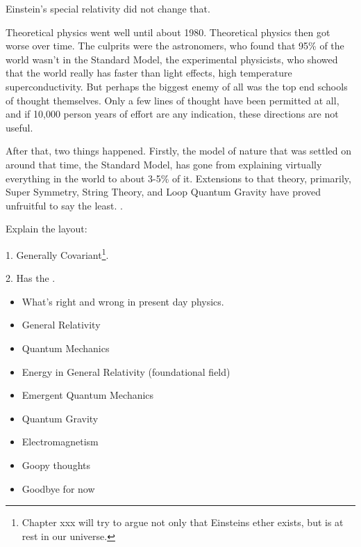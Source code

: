 \documentclass[../rzero]{subfiles}
\begin{document}
Einstein's special relativity did not change that. 

Theoretical physics went well until about 1980. Theoretical physics then got worse over time. The culprits were the astronomers, who found that 95\% of the world wasn't in the Standard Model, the experimental physicists, who showed that the world really has faster than light effects, high temperature superconductivity. But perhaps the biggest enemy of all was the top end schools of thought themselves. Only a few lines of thought have been permitted at all, and if 10,000 person years of effort are any indication, these directions are not useful. 


After that, two things happened. Firstly, the model of nature that was settled on around that time, the Standard Model, has gone from explaining virtually everything in the world to about 3-5\% of it. Extensions to that theory, primarily, Super Symmetry, String Theory, and Loop Quantum Gravity have proved unfruitful to say the least. \cite{woit2007not}\cite{smolin2007trouble}\cite{hossenfelder2018lost}. 




Explain the layout:



1. Generally Covariant\footnote{Chapter xxx will try to argue not only that Einsteins ether exists, but is at rest in our universe.}.

2. Has the .


\begin{itemize}
  \item What's right and wrong in present day physics.
  \item General Relativity
  \item Quantum Mechanics
  \item Energy in General Relativity (foundational field)
  \item Emergent Quantum Mechanics
  \item Quantum Gravity
  \item Electromagnetism
  \item Goopy thoughts 
  \item Goodbye for now
\end{itemize}
\end{document}
